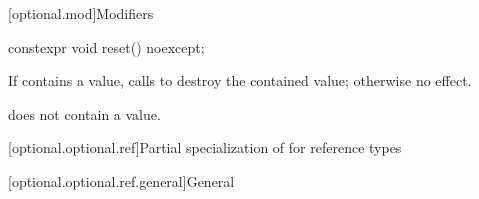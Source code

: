 [optional.mod]{Modifiers}

%
\begin{itemdecl}
constexpr void reset() noexcept;
\end{itemdecl}

\begin{itemdescr}
\pnum
\effects
If  contains a value, calls  to destroy the contained value;
otherwise no effect.

\pnum
\ensures
{} does not contain a value.
\end{itemdescr}

[optional.optional.ref]{Partial specialization of  for reference types}

[optional.optional.ref.general]{General}
